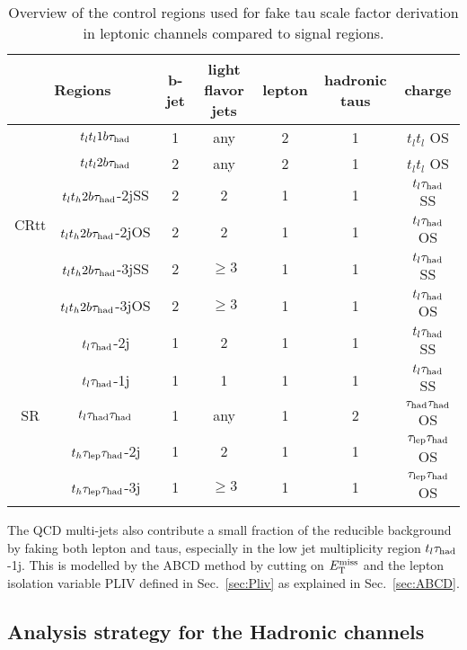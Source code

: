 \begin{table}
\centering
\caption{Overview of the control regions used for fake tau scale factor derivation in leptonic channels compared to signal regions.}
\label{tab:sfcr}
\begin{tabular}[h]{c|c|c|c|c|c|c}
\hline \hline
\multicolumn{2}{c|}{Regions} & b-jet & light flavor jets	& lepton & hadronic taus & charge\\ \hline
\multirow{6}{*}{CRtt}&$t_lt_l1b\tau_\text{had}$	& 1     & any				& 2      & 1			 & $t_lt_l$ OS\\ \cline{2-7}
&$t_lt_l2b\tau_\text{had}$	& 2     & any				& 2      & 1			 & $t_lt_l$ OS\\ \cline{2-7}
&$t_lt_h2b\tau_\text{had}$-2jSS	& 2     & 2 				& 1      & 1             & $t_l\tau_\text{had}$ SS\\ \cline{2-7}
&$t_lt_h2b\tau_\text{had}$-2jOS	& 2     & 2      			& 1      & 1             & $t_l\tau_\text{had}$ OS\\ \cline{2-7}
&$t_lt_h2b\tau_\text{had}$-3jSS	& 2     & $\ge3$ 			& 1      & 1             & $t_l\tau_\text{had}$ SS\\ \cline{2-7}
&$t_lt_h2b\tau_\text{had}$-3jOS	& 2     & $\ge3$      		& 1      & 1             & $t_l\tau_\text{had}$ OS\\ \hline
\multirow{5}{*}{SR}&$t_l\tau_\text{had}$-2j  & 1     & 2					& 1      & 1			 & $t_l\tau_\text{had}$ SS\\ \cline{2-7}
&$t_l\tau_\text{had}$-1j  & 1     & 1					& 1      & 1			 & $t_l\tau_\text{had}$ SS\\ \cline{2-7}
&$t_l\tau_\text{had}{}\tau_\text{had}$	   & 1     & any				& 1      & 2             & $\tau_\text{had}{}\tau_\text{had}$ OS\\ \cline{2-7}
&$t_h\tau_\text{lep}{}\tau_\text{had}$-2j   & 1     & 2      			& 1      & 1             & $\tau_\text{lep}{}\tau_\text{had}$ OS\\ \cline{2-7}
&$t_h\tau_\text{lep}{}\tau_\text{had}$-3j   & 1     & $\ge3$ 			& 1      & 1             & $\tau_\text{lep}{}\tau_\text{had}$ OS\\ \hline
\end{tabular}
\end{table}

The QCD multi-jets also contribute a small fraction of the reducible background by faking both lepton and taus, especially in the low jet multiplicity region $t_l\tau_\text{had}$-1j. This is modelled by the ABCD method by cutting on $E_{\text{T}}^{\text{miss}}$ and the lepton isolation variable PLIV defined in Sec.~\ref{sec:Pliv} as explained in Sec.~\ref{sec:ABCD}.

\subsection{Analysis strategy for the Hadronic channels}

